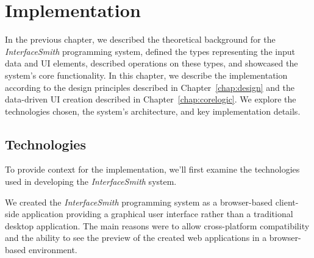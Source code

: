 \chapter{Implementation}
\label{chap:implementation}

In the previous chapter, we described the theoretical background for the \emph{InterfaceSmith} programming system, defined the types representing the input data and UI elements, described operations on these types, and showcased the system's core functionality.
In this chapter, we describe the implementation according to the design principles described in Chapter~\ref{chap:design} and the data-driven UI creation described in Chapter~\ref{chap:corelogic}.
We explore the technologies chosen, the system's architecture, and key implementation details.

\section{Technologies}
\label{sec:technologies}
To provide context for the implementation, we'll first examine the technologies used in developing the \emph{InterfaceSmith} system.

We created the \emph{InterfaceSmith} programming system as a browser-based client-side application providing a graphical user interface rather than a traditional desktop application.
The main reasons were to allow cross-platform compatibility and the ability to see the preview of the created web applications in a browser-based environment.

